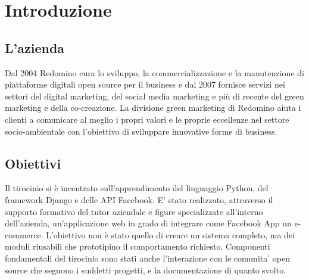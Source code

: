 \chapter{Introduzione}

\section{L'azienda}
Dal 2004 Redomino cura lo sviluppo, la commercializzazione e la manutenzione di piattaforme digitali open source per il business e dal 2007 fornisce servizi nei settori del digital marketing, del social media marketing e più di recente del green marketing e della co-creazione. La divisione green marketing di Redomino aiuta i clienti a comunicare al meglio i propri valori e le proprie eccellenze nel settore socio-ambientale con l'obiettivo di sviluppare innovative forme di business.

\section{Obiettivi}
Il tirocinio si è incentrato sull'apprendimento del linguaggio Python, del framework Django e delle API Facebook. 
E' stato realizzato, attraverso il supporto formativo del tutor aziendale e figure specializzate all'interno dell'azienda, un'applicazione web in grado di integrare come Facebook App un e-commerce. 
L'obiettivo non è stato quello di creare un sistema completo, ma dei moduli riusabili che prototipino il comportamento richiesto. 
Componenti fondamentali del tirocinio sono stati anche l'interazione con le comunita' open source che seguono i suddetti progetti, e la documentazione di quanto svolto.

